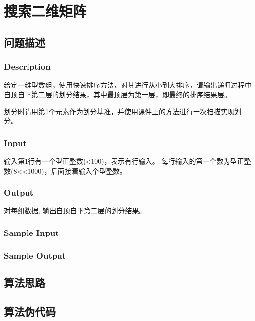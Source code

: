 \section{搜索二维矩阵}
\subsection{问题描述}
\subsubsection*{Description}

给定一维型数组，使用快速排序方法，对其进行从小到大排序，请输出递归过程中自顶自下第二层的划分结果，其中最顶层为第一层，即最终的排序结果层。

划分时请用第1个元素作为划分基准，并使用课件上的方法进行一次扫描实现划分。

\subsubsection*{Input}

输入第1行有一个型正整数(<100)，表示有行输入。
每行输入的第一个数为型正整数(8<<1000)，后面接着输入个型整数。

\subsubsection*{Output}

对每组数据, 输出自顶自下第二层的划分结果。

\subsubsection*{Sample Input}




\subsubsection*{Sample Output}



\subsection{算法思路}

\subsection{算法伪代码}
